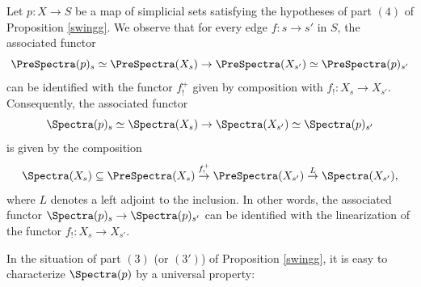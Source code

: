 \begin{remark}\label{campar}
Let $p: X \rightarrow S$ be a map of simplicial sets satisfying the hypotheses of
part $(4)$ of Proposition \ref{swingg}. We observe that for every edge
$f: s \rightarrow s'$ in $S$, the associated functor
$$\PreSpectra(p)_{s} \simeq \PreSpectra(X_s)
\rightarrow \PreSpectra(X_{s'}) \simeq \PreSpectra(p)_{s'}$$
can be identified with the functor $f_{!}^{+}$ given by composition with $f_{!}: X_{s} \rightarrow X_{s'}$.
Consequently, the associated functor 
$$\Spectra(p)_{s} \simeq \Spectra(X_s)
\rightarrow \Spectra(X_{s'}) \simeq \Spectra(p)_{s'}$$
is given by the composition
$$ \Spectra(X_s) \subseteq \PreSpectra(X_s) 
\stackrel{ f_{!}^{+}}{\rightarrow} \PreSpectra(X_{s'})
\stackrel{L}{\rightarrow} \Spectra(X_{s'}),$$
where $L$ denotes a left adjoint to the inclusion. In other words,
the associated functor $\Spectra(p)_{s} \rightarrow \Spectra(p)_{s'}$ can be
identified with the linearization of the functor $f_{!}: X_{s} \rightarrow X_{s'}$.
\end{remark}

In the situation of part $(3)$ (or $(3')$) of Proposition \ref{swingg}, it is easy to
characterize $\Spectra(p)$ by a universal property:

